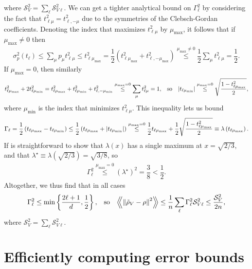 \documentclass[notitlepage,twocolumn]{revtex4-2}
\renewcommand{\t}{\text} %
\newcommand{\f}[2]{\dfrac{#1}{#2}} %
\newcommand{\p}[1]{\left(#1\right)} %
\renewcommand{\Set}[1]{\left\{#1\right\}} %
\newcommand{\Bbk}[1]
{\left\langle\!\!\left\langle #1 \right\rangle\!\!\right\rangle}
\renewcommand{\S}{\mathcal{S}}
\begin{document}
where $\S_V^2=\sum_\ell\S_{V\ell}^2$.
We can get a tighter analytical bound on $\Gamma_\ell^2$ by considering the fact that $t_{\ell\mu}^2 = t_{\ell,-\mu}^2$ due to the symmetries of the Clebsch-Gordan coefficients.
Denoting the index that maximizes $t_{\ell\mu}^2$ by $\mu_{\t{max}}$, it follows that if $\mu_{\t{max}}\ne0$ then
\begin{align}
  \sigma_p^2\p{t_\ell} \le \sum_\mu p_\mu t_{\ell\mu}^2
  \le t_{\ell\mu_{\t{max}}}^2
  = \f12 \p{t_{\ell\mu_{\t{max}}}^2 + t_{\ell,-\mu_{\t{max}}}^2}
  \stackrel{\mu_{\t{max}}\ne0}{\le} \f12 \sum_\mu t_{\ell\mu}^2
  = \f12.
\end{align}
If $\mu_{\t{max}}=0$, then similarly
\begin{align}
  t_{\ell\mu_{\t{max}}}^2 + 2 t_{\ell\mu_{\t{min}}}^2
  = t_{\ell\mu_{\t{max}}}^2 + t_{\ell\mu_{\t{min}}}^2
  + t_{\ell,-\mu_{\t{min}}}^2
  \stackrel{\mu_{\t{max}}=0}{\le}
  \sum_\mu t_{\ell\mu}^2 = 1,
  &&
  \t{so}
  &&
  \abs{t_{\ell\mu_{\t{min}}}}
  \stackrel{\mu_{\t{max}}=0}{\le}
  \sqrt{\f{1 - t_{\ell\mu_{\t{max}}}^2}{2}},
\end{align}
where $\mu_{\t{min}}$ is the index that minimizes $t_{\ell\mu}^2$.
This inequality lets us bound
\begin{align}
  \Gamma_\ell
  = \f12 \p{t_{\ell\mu_{\t{max}}} - t_{\ell\mu_{\t{min}}}}
  \le \f12 \p{t_{\ell\mu_{\t{max}}} + \abs{t_{\ell\mu_{\t{min}}}}}
  \stackrel{\mu_{\t{max}}=0}{\le}
  \f12 t_{\ell\mu_{\t{max}}}
  + \f12\sqrt{\f{1 - t_{\ell\mu_{\t{max}}}^2}{2}}
  \equiv \lambda\p{t_{\ell\mu_{\t{max}}}}.
\end{align}
If is straightforward to show that $\lambda\p{x}$ has a single maximum at $x=\sqrt{2/3}$, and that $\lambda^\star\equiv \lambda\p{\sqrt{2/3}}=\sqrt{3/8}$, so
\begin{align}
  \Gamma_\ell^2
  \stackrel{\mu_{\t{max}}=0}{\le} \p{\lambda^\star}^2
  = \f38 < \f12.
\end{align}
Altogether, we thus find that in all cases
\begin{align}
  \Gamma_\ell^2 \le \min\Set{\f{2\ell+1}{d}, \f12},
  &&
  \t{so}
  &&
  \Bbk{\norm{\tilde\rho_V-\rho}^2}
  \le \f1n \sum_\ell \Gamma_\ell^2 \S_{V\ell}^2
  \le \f{\S_V^2}{2n},
\end{align}
where $\S_V^2 = \sum_\ell \S_{V\ell}^2$.

\section{Efficiently computing error bounds}
\label{sec:compute}
\end{document}
